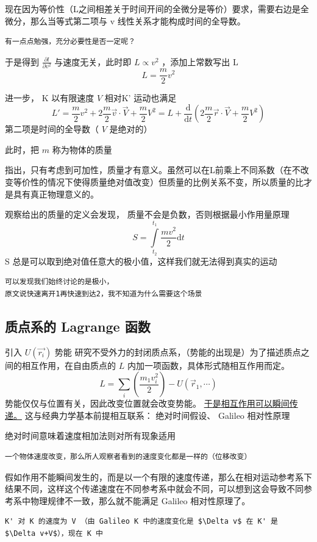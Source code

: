 \documentclass[11pt]{article}
\begin{document}
现在因为等价性（L之间相差关于时间开间的全微分是等价）要求，需要右边是全微分，那么当等式第二项与 v 线性关系才能构成时间的全导数。

\begin{verbatim}
有一点点勉强，充分必要性是否一定呢？
\end{verbatim}

于是得到 \(\frac{\partial l}{\partial v^2}\) 与速度无关，此时即 \(L\propto v^2\) ，添加上常数写出 L
\begin{equation}
\label{eq:12}
L=\frac{m}{2}v^2
\end{equation}

进一步， K 以有限速度 \(V\) 相对K' 运动也满足
\begin{equation}
\label{eq:13}
L'=\frac{m}{2}v^2+2 \frac{m}{2}\vec{v}\cdot \vec{V}+\frac{m}{2}V^2=L+\frac{\mathrm{d}}{\mathrm{d}t}(2 \frac{m}{2}\vec{r}\cdot\vec{V}+\frac{m}{2}V^2)
\end{equation}
第二项是时间的全导数（ \(V\) 是绝对的）

此时，把 \(m\) 称为物体的质量

指出，只有考虑到可加性，质量才有意义。虽然可以在L前乘上不同系数（在不改变等价性的情况下使得质量绝对值改变）但质量的比例关系不变，所以质量的比才是具有真正物理意义的。

观察给出的质量的定义会发现，
质量不会是负数，否则根据最小作用量原理
\begin{equation}
\label{eq:14}
S=\int\limits_{t_2}^{t_1}\frac{mv^2}{2}\mathrm{d}t
\end{equation}
S 总是可以取到绝对值任意大的极小值，这样我们就无法得到真实的运动
\begin{verbatim}
可以发现我们始终讨论的是极小，
原文说快速离开1再快速到达2，我不知道为什么需要这个场景
\end{verbatim}

\subsection{质点系的 Lagrange 函数}
\label{sec:org4d56379}
引入 \(U(\vec{r_i})\) 势能
研究不受外力的封闭质点系，（势能的出现是）为了描述质点之间的相互作用，在自由质点的 \(L\) 内加一项函数，具体形式随相互作用而定。
\begin{equation}
\label{eq:15}
L=\sum_i(\frac{m_1v^2_i}{2})-U(\vec{r}_1,\cdots)
\end{equation}
势能仅仅与位置有关，因此改变位置就会改变势能。
\uline{于是相互作用可以瞬间传递。}
这与经典力学基本前提相互联系：
绝对时间假设、 Galileo 相对性原理

绝对时间意味着速度相加法则对所有现象适用
\begin{verbatim}
一个物体速度改变，那么所人观察者看到的速度变化都是一样的（位移改变）
\end{verbatim}
假如作用不能瞬间发生的，而是以一个有限的速度传递，那么在相对运动参考系下结果不同，这样这个传递速度在不同参考系中就会不同，可以想到这会导致不同参考系中物理规律不一致，那么就不能满足 Galileo 相对性原理了。

\begin{verbatim}
K' 对 K 的速度为 V （由 Galileo K 中的速度变化是 $\Delta v$ 在 K' 是 $\Delta v+V$），现在 K 中
\end{verbatim}
\end{document}
